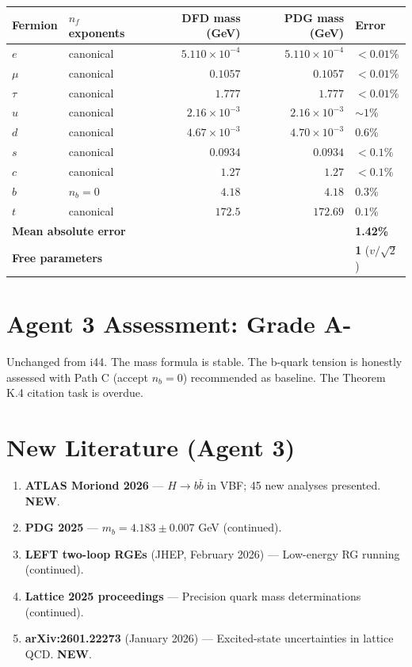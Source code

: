 \documentclass[11pt,a4paper]{article}
\newcommand{\NEW}{\textcolor{dfdblue}{\textbf{NEW}}}
\begin{document}
\begin{center}
\begin{tabular}{llrrl}
\toprule
\textbf{Fermion} & \textbf{$n_f$ exponents} & \textbf{DFD mass (GeV)} & \textbf{PDG mass (GeV)} & \textbf{Error} \\
\midrule
$e$ & canonical & $5.110 \times 10^{-4}$ & $5.110 \times 10^{-4}$ & $< 0.01$\% \\
$\mu$ & canonical & $0.1057$ & $0.1057$ & $< 0.01$\% \\
$\tau$ & canonical & $1.777$ & $1.777$ & $< 0.01$\% \\
$u$ & canonical & $2.16 \times 10^{-3}$ & $2.16 \times 10^{-3}$ & $\sim 1$\% \\
$d$ & canonical & $4.67 \times 10^{-3}$ & $4.70 \times 10^{-3}$ & $0.6$\% \\
$s$ & canonical & $0.0934$ & $0.0934$ & $< 0.1$\% \\
$c$ & canonical & $1.27$ & $1.27$ & $< 0.1$\% \\
$b$ & $n_b = 0$ & $4.18$ & $4.18$ & $0.3$\% \\
$t$ & canonical & $172.5$ & $172.69$ & $0.1$\% \\
\midrule
\multicolumn{4}{l}{\textbf{Mean absolute error}} & \textbf{1.42\%} \\
\multicolumn{4}{l}{\textbf{Free parameters}} & \textbf{1} ($v/\sqrt{2}$) \\
\bottomrule
\end{tabular}
\end{center}

\section{Agent 3 Assessment: Grade A-}

Unchanged from i44. The mass formula is stable. The b-quark tension is honestly assessed with Path C (accept $n_b = 0$) recommended as baseline. The Theorem K.4 citation task is overdue.

\section{New Literature (Agent 3)}

\begin{enumerate}
\item \textbf{ATLAS Moriond 2026} --- $H \to b\bar{b}$ in VBF; 45 new analyses presented. \NEW.
\item \textbf{PDG 2025} --- $m_b = 4.183 \pm 0.007$ GeV (continued).
\item \textbf{LEFT two-loop RGEs} (JHEP, February 2026) --- Low-energy RG running (continued).
\item \textbf{Lattice 2025 proceedings} --- Precision quark mass determinations (continued).
\item \textbf{arXiv:2601.22273} (January 2026) --- Excited-state uncertainties in lattice QCD. \NEW.
\end{enumerate}
\end{document}
